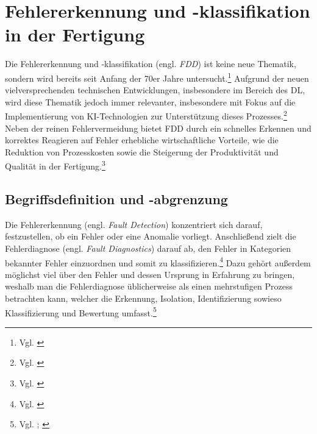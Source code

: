 



\section{Fehlererkennung und -klassifikation in der Fertigung}

Die Fehlererkennung und -klassifikation (engl. \textit{\ac{FDD}}) ist keine neue Thematik, sondern wird bereits seit Anfang der 70er Jahre untersucht.\footnote{Vgl. \cite[S. 4]{mercorelli_recent_2024}} Aufgrund der neuen vielversprechenden technischen Entwicklungen, insbesondere im Bereich des \ac{DL}, wird diese Thematik jedoch immer relevanter, insbesondere mit Fokus auf die Implementierung von \ac{KI}-Technologien zur Unterstützung dieses Prozesses.\footnote{Vgl. \cite[S. 1]{seid_ahmed_advances_2025}} Neben der reinen Fehlervermeidung bietet \ac{FDD} durch ein schnelles Erkennen und korrektes Reagieren auf Fehler erhebliche wirtschaftliche Vorteile, wie die Reduktion von Prozesskosten sowie die Steigerung der Produktivität und Qualität in der Fertigung.\footnote{Vgl. \cite[S. 4]{seid_ahmed_advances_2025}}

\subsection{Begriffsdefinition und -abgrenzung}
Die Fehlererkennung (engl. \textit{Fault Detection}) konzentriert sich darauf, festzustellen, ob ein Fehler oder eine Anomalie vorliegt. Anschließend zielt die Fehlerdiagnose (engl. \textit{Fault Diagnostics}) darauf ab, den Fehler in Kategorien bekannter Fehler einzuordnen und somit zu klassifizieren.\footnote{Vgl. \cite[S. 442]{wu_transformer-based_2023}} Dazu gehört außerdem möglichst viel über den Fehler und dessen Ursprung in Erfahrung zu bringen, weshalb man die Fehlerdiagnose üblicherweise als einen mehrstufigen Prozess betrachten kann, welcher die Erkennung, Isolation, Identifizierung sowieso Klassifizierung und Bewertung umfasst.\footnote{Vgl. \cite[S. 12]{mercorelli_recent_2024}; \cite[S. 16]{seid_ahmed_advances_2025}}

